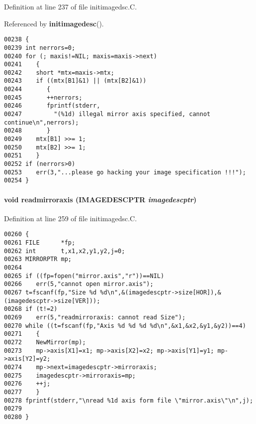 Definition at line 237 of file initimagedsc.C.

Referenced by {\bf initimagedesc}().\small\begin{verbatim}00238 {
00239 int nerrors=0;
00240 for (; maxis!=NIL; maxis=maxis->next)
00241    {
00242    short *mtx=maxis->mtx;
00243    if ((mtx[B1]&1) || (mtx[B2]&1))
00244       {
00245       ++nerrors;
00246       fprintf(stderr,
00247         "(%1d) illegal mirror axis specified, cannot continue\n",nerrors);
00248       }
00249    mtx[B1] >>= 1;
00250    mtx[B2] >>= 1;
00251    }
00252 if (nerrors>0)
00253    err(3,"...please go hacking your image specification !!!");
00254 }
\end{verbatim}\normalsize 
\label{initimagedsc.C_a8}
\paragraph{\setlength{\rightskip}{0pt plus 5cm}void readmirroraxis ({\bf IMAGEDESCPTR} {\em imagedescptr})}\hfill



Definition at line 259 of file initimagedsc.C.\small\begin{verbatim}00260 {
00261 FILE      *fp;
00262 int       t,x1,x2,y1,y2,j=0;
00263 MIRRORPTR mp;
00264 
00265 if ((fp=fopen("mirror.axis","r"))==NIL)
00266    err(5,"cannot open mirror.axis");
00267 t=fscanf(fp,"Size %d %d\n",&(imagedescptr->size[HOR]),&(imagedescptr->size[VER]));
00268 if (t!=2)
00269    err(5,"readmirroraxis: cannot read Size");
00270 while ((t=fscanf(fp,"Axis %d %d %d %d\n",&x1,&x2,&y1,&y2))==4)
00271    {
00272    NewMirror(mp);
00273    mp->axis[X1]=x1; mp->axis[X2]=x2; mp->axis[Y1]=y1; mp->axis[Y2]=y2;
00274    mp->next=imagedescptr->mirroraxis;
00275    imagedescptr->mirroraxis=mp;
00276    ++j;
00277    }
00278 fprintf(stderr,"\nread %1d axis form file \"mirror.axis\"\n",j);
00279 
00280 }
\end{verbatim}\normalsize 
